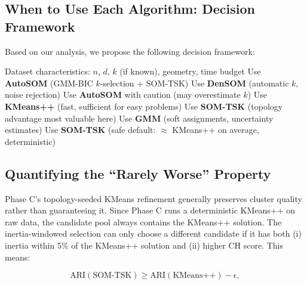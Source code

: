 \documentclass[journal]{IEEEtran}
\begin{document}
\subsection{When to Use Each Algorithm: Decision Framework}
\label{sec:decision}

Based on our analysis, we propose the following decision framework:

\begin{algorithm}
\caption{Practitioner Decision Framework}
\label{alg:decision}
\begin{algorithmic}[1]
\Require Dataset characteristics: $n$, $d$, $k$ (if known), geometry, time budget
    \State Use \textbf{AutoSOM} (GMM-BIC $k$-selection + SOM-TSK)
    \State Use \textbf{DenSOM} (automatic $k$, noise rejection)
  \Else
    \State Use \textbf{AutoSOM} with caution (may overestimate $k$)
  \EndIf
{}
    \State Use \textbf{KMeans++} (fast, sufficient for easy problems)
    \State Use \textbf{SOM-TSK} (topology advantage most valuable here)
    \State Use \textbf{GMM} (soft assignments, uncertainty estimates)
  \Else
    \State Use \textbf{SOM-TSK} (safe default: $\approx$ KMeans++ on average, deterministic)
  \EndIf
\EndIf
\end{algorithmic}
\end{algorithm}

\subsection{Quantifying the ``Rarely Worse'' Property}
\label{sec:guarantee}

Phase C's topology-seeded KMeans refinement generally preserves cluster quality rather than guaranteeing it. Since Phase C runs a deterministic KMeans++ on raw data, the candidate pool always contains the KMeans++ solution. The inertia-windowed selection can only choose a different candidate if it has both (i) inertia within 5\% of the KMeans++ solution and (ii) higher CH score. This means:

\begin{equation}
  \mathrm{ARI}(\text{SOM-TSK}) \ge \mathrm{ARI}(\text{KMeans++}) - \epsilon,
\end{equation}
\end{document}
